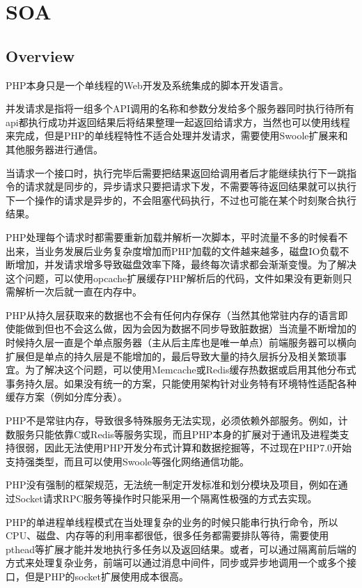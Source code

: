 \part{SOA}


\chapter{Overview}



PHP本身只是一个单线程的Web开发及系统集成的脚本开发语言。


并发请求是指将一组多个API调用的名称和参数分发给多个服务器同时执行待所有api都执行成功并返回结果后将结果整理一起返回给请求方，​当然也可以使用线程来完成，但是PHP的单线程特性不适合处理并发请求，需要使用Swoole扩展来和其他服务器进行通信。

​当请求一个接口时，执行完毕后需要把结果返回给调用者后才能继续执行下一跳指令的请求就是同步的，异步请求只要把请求下发，不需要等待返回结果就可以执行下一个操作的请求是异步的，不会阻塞代码执行，不过也可能在某个时刻聚合执行结果。

PHP处理每个请求时都需要重新加载并解析一次脚本，平时流量不多的时候看不出来，当业务发展后业务复杂度增加而PHP加载的文件越来越多，磁盘IO负载不断增加，并发请求增多导致磁盘效率下降，最终每次请求都会渐渐变慢。为了解决这个问题，可以使用opcache扩展缓存PHP解析后的代码，文件如果没有更新则只需解析一次后就一直在内存中。

PHP从持久层获取来的数据也不会有任何内存保存（当然其他常驻内存的语言即使能做到但也不会这么做，因为会因为数据不同步导致脏数据）当流量不断增加的时候持久层一直是个单点服务器（主从后主库也是唯一单点）前端服务器可以横向扩展但是单点的持久层是不能增加的，最后导致大量的持久层拆分及相关繁琐事宜。为了解决这个问题，可以使用Memcache或Redis缓存热数据或启用其他分布式事务持久层。如果没有统一的方案，只能使用架构针对业务特有环境特性适配各种缓存方案（例如分库分表）。

PHP不是常驻内存，导致很多特殊服务无法实现，必须依赖外部服务。例如，计数服务只能依靠C或Redis等服务实现，而且PHP本身的扩展对于通讯及进程类支持很弱，因此无法使用PHP开发分布式计算和数据挖掘等，不过现在PHP7.0开始支持强类型，而且可以使用Swoole等强化网络通信功能。

PHP没有强制的框架规范，无法统一制定开发标准和划分模块及项目，例如在通过Socket请求RPC服务等操作时只能采用一个隔离性极强的方式去实现。

PHP的单进程单线程模式在当处理复杂的业务的时候只能串行执行命令，所以CPU、磁盘、内存等的利用率都很低，很多任务都需要排队等待，需要使用pthead等扩展才能并发地执行多任务以及返回结果。或者，可以通过隔离前后端的方式来处理复杂业务，前端可以通过消息中间件，同步或异步地调用一个或多个接口，但是PHP的socket扩展使用成本很高。

